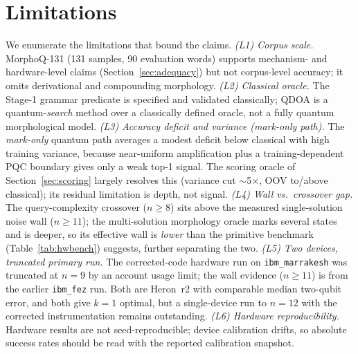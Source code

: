 \documentclass[journal]{IEEEtran}
\begin{document}
\section{Limitations}
\label{sec:limitations}
We enumerate the limitations that bound the claims.
\emph{(L1) Corpus scale.} MorphoQ-131 (131 samples, 90 evaluation words) supports
mechanism- and hardware-level claims (Section~\ref{sec:adequacy}) but not
corpus-level accuracy; it omits derivational and compounding morphology.
\emph{(L2) Classical oracle.} The Stage-1 grammar predicate is specified and
validated classically; QDOA is a quantum-\emph{search} method over a classically
defined oracle, not a fully quantum morphological model.
\emph{(L3) Accuracy deficit and variance (mark-only path).} The \emph{mark-only}
quantum path averages a modest deficit below classical with high training
variance, because near-uniform amplification plus a training-dependent PQC
boundary gives only a weak top-1 signal. The scoring oracle of
Section~\ref{sec:scoring} largely resolves this (variance cut $\sim$5$\times$, OOV
to/above classical); its residual limitation is depth, not signal.
\emph{(L4) Wall vs.\ crossover gap.} The query-complexity crossover ($n\!\ge\!8$)
sits above the measured single-solution noise wall ($n\!\ge\!11$); the
multi-solution morphology oracle marks several states and is deeper, so its
effective wall is \emph{lower} than the primitive benchmark
(Table~\ref{tab:hwbench}) suggests, further separating the two.
\emph{(L5) Two devices, truncated primary run.} The corrected-code hardware run
on \texttt{ibm\_marrakesh} was truncated at $n{=}9$ by an account usage limit;
the wall evidence ($n\!\ge\!11$) is from the earlier \texttt{ibm\_fez} run. Both
are Heron~r2 with comparable median two-qubit error, and both give $k{=}1$
optimal, but a single-device run to $n{=}12$ with the corrected instrumentation
remains outstanding.
\emph{(L6) Hardware reproducibility.} Hardware results are not seed-reproducible;
device calibration drifts, so absolute success rates should be read with the
reported calibration snapshot.
\end{document}
